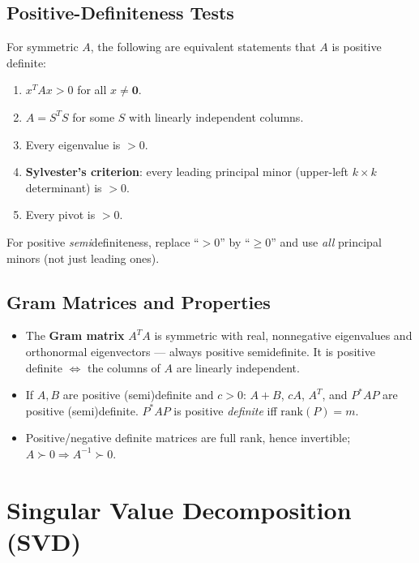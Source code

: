 \documentclass[hidelinks]{article}
\begin{document}
\subsection{Positive-Definiteness Tests}
For symmetric $A$, the following are equivalent statements that $A$ is positive definite:
\begin{enumerate}
    \item $x^TAx > 0$ for all $x\neq \mathbf 0$.
    \item $A = S^TS$ for some $S$ with linearly independent columns.
    \item Every eigenvalue is $> 0$.
    \item \textbf{Sylvester's criterion}: every leading principal minor (upper-left $k\times k$ determinant) is $> 0$.
    \item Every pivot is $> 0$.
\end{enumerate}
For positive \emph{semi}definiteness, replace ``$>0$'' by ``$\ge 0$'' and use \emph{all} principal minors (not just leading ones).

\subsection{Gram Matrices and Properties}
\begin{itemize}
    \item The \textbf{Gram matrix} $A^TA$ is symmetric with real, nonnegative eigenvalues and orthonormal eigenvectors — always positive semidefinite. It is positive definite $\iff$ the columns of $A$ are linearly independent.
    \item If $A,B$ are positive (semi)definite and $c>0$: $A+B$, $cA$, $A^T$, and $P^{*}AP$ are positive (semi)definite. $P^{*}AP$ is positive \emph{definite} iff $\mathrm{rank}(P)=m$.
    \item Positive/negative definite matrices are full rank, hence invertible; $A\succ 0 \Rightarrow A^{-1}\succ 0$.
\end{itemize}

\section{Singular Value Decomposition (SVD)}
\end{document}
